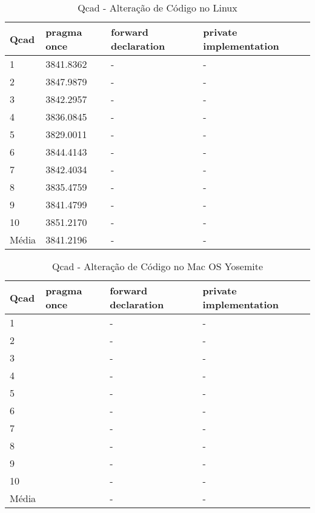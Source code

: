 \begin{table}[!h]
\centering
\caption{Qcad - Alteração de Código no Linux}
\label{tab:alteracao_de_codigo:linux:qcad}
\begin{tabular}{llll}
\textbf{Qcad} & \textbf{pragma once} & \textbf{forward declaration} & \textbf{private implementation}   \\ \toprule
1                                    &  3841.8362  &  -   & - \\ 
2                                    &  3847.9879  &  -   & - \\ 
3                                    &  3842.2957  &  -   & - \\ 
4                                    &  3836.0845  &  -   & - \\ 
5                                    &  3829.0011  &  -   & - \\ 
6                                    &  3844.4143  &  -   & - \\ 
7                                    &  3842.4034  &  -   & - \\ 
8                                    &  3835.4759  &  -   & - \\ 
9                                    &  3841.4799  &  -   & - \\ 
10                                   &  3851.2170  &  -   & - \\ \bottomrule
Média                                &  3841.2196  &  -   & - \\ 
\end{tabular}
\end{table}

\begin{table}[!h]
\centering
\caption{Qcad - Alteração de Código no Mac OS Yosemite}
\label{tab:alteracao_de_codigo:mac:qcad}
\begin{tabular}{llll}
\textbf{Qcad} & \textbf{pragma once} & \textbf{forward declaration} & \textbf{private implementation}   \\ \toprule
1                                    &    &  -   & - \\ 
2                                    &    &  -   & - \\ 
3                                    &    &  -   & - \\ 
4                                    &    &  -   & - \\ 
5                                    &    &  -   & - \\ 
6                                    &    &  -   & - \\ 
7                                    &    &  -   & - \\ 
8                                    &    &  -   & - \\ 
9                                    &    &  -   & - \\ 
10                                   &    &  -   & - \\ \bottomrule
Média                                &    &  -   & - \\ 
\end{tabular}
\end{table}

